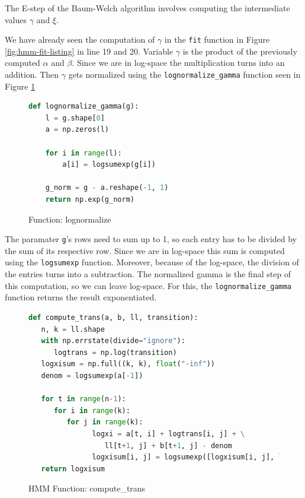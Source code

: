 The E-step of the Baum-Welch algorithm involves computing the intermediate values $\gamma$ and $\xi$. 

We have already seen the computation of $\gamma$ in the \texttt{fit} function in Figure \ref{fig:hmm-fit-listing} in line 19 and 20. Variable $\gamma$ is the product of the previously computed $\alpha$ and $\beta$. Since we are in log-space the multiplication turns into an addition. Then $\gamma$ gets normalized using the \texttt{lognormalize\_gamma} function seen in Figure \ref{fig:lognormalize-listing}

\begin{figure}
\begin{singlespace}
\begin{lstlisting}[language=Python]
   def lognormalize_gamma(g):
    l = g.shape[0]
    a = np.zeros(l)

    for i in range(l):
        a[i] = logsumexp(g[i])

    g_norm = g - a.reshape(-1, 1)
    return np.exp(g_norm)
\end{lstlisting}
\end{singlespace}
\caption{Function: lognormalize}    
\label{fig:lognormalize-listing}
\end{figure}

The paramater \texttt{g}'s rows need to sum up to 1, so each entry has to be divided by the sum of its respective row. Since we are in log-space this sum is computed using the \texttt{logsumexp} function. Moreover, because of the log-space, the division of the entries turns into a subtraction. The normalized gamma is the final step of this computation, so we can leave log-space. For this, the \texttt{lognormalize\_gamma} function returns the result exponentiated. 


\begin{figure}
\begin{singlespace}
\begin{lstlisting}[language=Python]
def compute_trans(a, b, ll, transition):
   n, k = ll.shape
   with np.errstate(divide="ignore"):
      logtrans = np.log(transition)
   logxisum = np.full((k, k), float("-inf"))
   denom = logsumexp(a[-1])

   for t in range(n-1):
      for i in range(k):
         for j in range(k):
               logxi = a[t, i] + logtrans[i, j] + \
                  ll[t+1, j] + b[t+1, j] - denom
               logxisum[i, j] = logsumexp([logxisum[i, j], logxi])
   return logxisum
\end{lstlisting}
\end{singlespace}
\caption{HMM Function: compute\_trans}    
\label{fig:hmm-computetrans-listing}
\end{figure}

